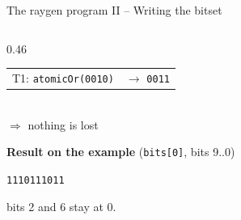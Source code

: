 \documentclass[8pt, xcolor=table,aspectratio=169]{beamer}
\begin{document}
\begin{frame}[fragile]{\textcolor{activecolor}{The raygen program II -- Writing the bitset}}
\begin{columns}[T]
\begin{column}{0.46\textwidth}
\begin{center}
\begin{tabular}{ll}
        T1: \texttt{atomicOr(0010)} & $\to$ \texttt{0011}\\
      \end{tabular}\\[1mm]
      \textcolor{green!50!black}{$\Rightarrow$ nothing is lost}
      \end{center}
      \vspace{2mm}
      \textbf{Result on the example} (\texttt{bits[0]}, bits 9..0)
      \begin{center}
        \texttt{1110111011}
      \end{center}
      \centering bits 2 and 6 stay at \alert{0}.
    \end{column}
  \end{columns}
\end{frame}
\usetikzlibrary{fit,backgrounds}
\end{document}

